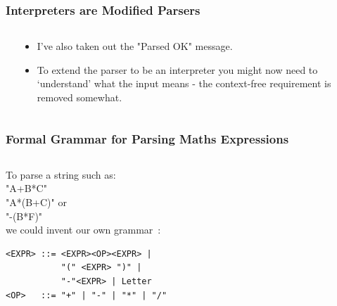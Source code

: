 
\begin{frame}[fragile]
\frametitle{Interpreters are Modified Parsers}
\begin{columns}[T]

\begin{column}{0.45\textwidth}

\end{column}

\pause
\begin{column}{0.45\textwidth}
\pause
\begin{itemize}[<+->]
\item I've also taken out the "Parsed OK" message.
\item To extend the parser to be an interpreter you might now need to `understand' what the input means - the context-free requirement is removed somewhat.
\end{itemize}
\end{column}

\end{columns}
\end{frame}


\begin{frame}[fragile]
\frametitle{Formal Grammar for Parsing Maths Expressions}

\begin{columns}[T]

\begin{column}{0.45\textwidth}
To parse a string such as:\\
"A+B*C"\\
"A*(B+C)" or\\
"-(B*F)"\\
we could invent our own grammar~:

\pause
\begin{verbatim}
<EXPR> ::= <EXPR><OP><EXPR> |
           "(" <EXPR> ")" |
           "-"<EXPR> | Letter
<OP>   ::= "+" | "-" | "*" | "/"
\end{verbatim}
\end{column}

\pause
\begin{column}{0.45\textwidth}

\end{column}

\end{columns}
\end{frame}


